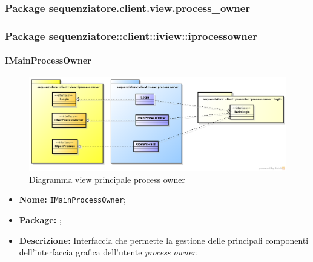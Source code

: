 \subsubsection{Package sequenziatore.client.view.process_owner}
\subsubsection{Package sequenziatore::client::iview::iprocessowner}

\paragraph{IMainProcessOwner}
\begin{figure}[H] \centering \includegraphics[width=%
\textwidth]
{./pack/ProcessOwner.png} \caption{Diagramma view principale process owner}
\end{figure}
\begin{itemize}
\item \textbf{Nome:} \texttt{IMainProcessOwner};
\item \textbf{Package:} \texttt{\iViewAdmin{}};
\item \textbf{Descrizione:} Interfaccia che permette la gestione delle principali componenti dell'interfaccia grafica dell'utente \textit{process owner}.
\end{itemize}

